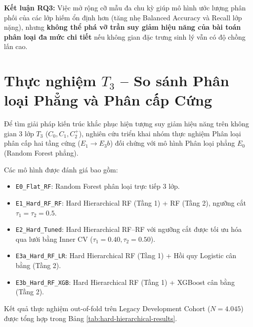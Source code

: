 \textbf{Kết luận RQ3:} Việc mở rộng cỡ mẫu đa chu kỳ giúp mô hình ước lượng phân phối của các lớp hiếm ổn định hơn (tăng nhẹ Balanced Accuracy và Recall lớp nặng), nhưng \textbf{không thể phá vỡ trần suy giảm hiệu năng của bài toán phân loại đa mức chi tiết} nếu không gian đặc trưng sinh lý vẫn có độ chồng lấn cao.

\section{Thực nghiệm $T_3$ – So sánh Phân loại Phẳng và Phân cấp Cứng}
\label{sec:thuc-nghiem-t3-hard}

Để tìm giải pháp kiến trúc khắc phục hiện tượng suy giảm hiệu năng trên không gian 3 lớp $T_3$ ($C_0, C_1, C_2^+$), nghiên cứu triển khai nhóm thực nghiệm Phân loại phân cấp hai tầng cứng ($E_1 \to E_3b$) đối chứng với mô hình Phân loại phẳng $E_0$ (Random Forest phẳng).

Các mô hình được đánh giá bao gồm:
\begin{itemize}
    \item \texttt{E0\_Flat\_RF}: Random Forest phân loại trực tiếp 3 lớp.
    \item \texttt{E1\_Hard\_RF\_RF}: Hard Hierarchical RF (Tầng 1) + RF (Tầng 2), ngưỡng cắt $\tau_1 = \tau_2 = 0.5$.
    \item \texttt{E2\_Hard\_Tuned}: Hard Hierarchical RF--RF với ngưỡng cắt được tối ưu hóa qua lưới bằng Inner CV ($\tau_1 = 0.40, \tau_2 = 0.50$).
    \item \texttt{E3a\_Hard\_RF\_LR}: Hard Hierarchical RF (Tầng 1) + Hồi quy Logistic cân bằng (Tầng 2).
    \item \texttt{E3b\_Hard\_RF\_XGB}: Hard Hierarchical RF (Tầng 1) + XGBoost cân bằng (Tầng 2).
\end{itemize}

Kết quả thực nghiệm out-of-fold trên Legacy Development Cohort ($N = 4.045$) được tổng hợp trong Bảng \ref{tab:hard-hierarchical-results}.

